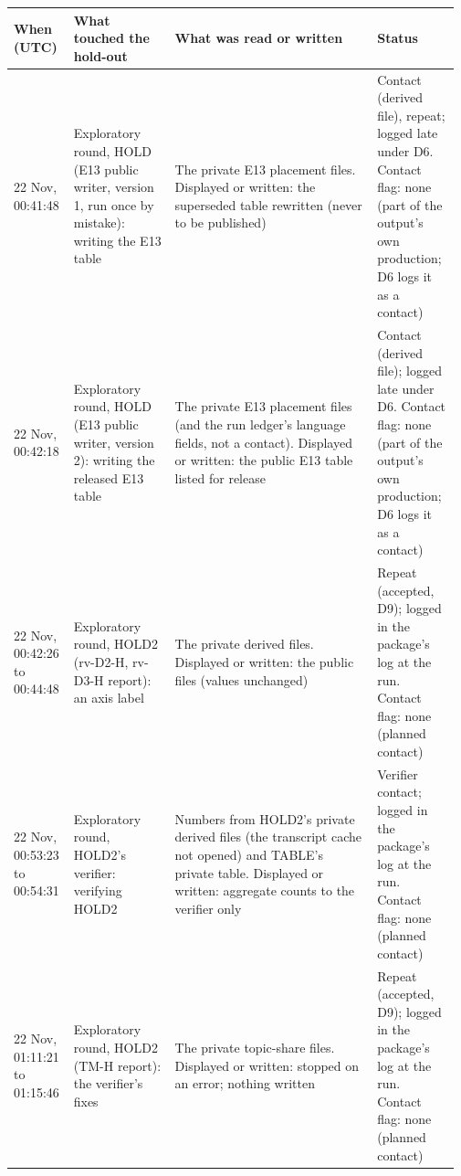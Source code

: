 {\scriptsize\setlength{\tabcolsep}{2pt}
\begin{tabular}{@{}p{0.13\linewidth}p{0.22\linewidth}p{0.44\linewidth}p{0.18\linewidth}@{}}
\toprule
When (UTC) & What touched the hold-out & What was read or written & Status \\
\midrule
22 Nov, 00:41:48 & Exploratory round, HOLD (E13 public writer, version 1, run once by mistake): writing the E13 table & The private E13 placement files. Displayed or written: the superseded table rewritten (never to be published) & Contact (derived file), repeat; logged late under D6. Contact flag: none (part of the output's own production; D6 logs it as a contact) \\
22 Nov, 00:42:18 & Exploratory round, HOLD (E13 public writer, version 2): writing the released E13 table & The private E13 placement files (and the run ledger's language fields, not a contact). Displayed or written: the public E13 table listed for release & Contact (derived file); logged late under D6. Contact flag: none (part of the output's own production; D6 logs it as a contact) \\
22 Nov, 00:42:26 to 00:44:48 & Exploratory round, HOLD2 (rv-D2-H, rv-D3-H report): an axis label & The private derived files. Displayed or written: the public files (values unchanged) & Repeat (accepted, D9); logged in the package's log at the run. Contact flag: none (planned contact) \\
22 Nov, 00:53:23 to 00:54:31 & Exploratory round, HOLD2's verifier: verifying HOLD2 & Numbers from HOLD2's private derived files (the transcript cache not opened) and TABLE's private table. Displayed or written: aggregate counts to the verifier only & Verifier contact; logged in the package's log at the run. Contact flag: none (planned contact) \\
22 Nov, 01:11:21 to 01:15:46 & Exploratory round, HOLD2 (TM-H report): the verifier's fixes & The private topic-share files. Displayed or written: stopped on an error; nothing written & Repeat (accepted, D9); logged in the package's log at the run. Contact flag: none (planned contact) \\

\end{tabular}}
